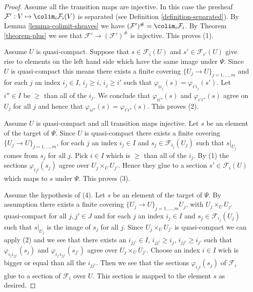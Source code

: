 \begin{proof}
Assume all the transition maps are injective. In this case the presheaf
$\mathcal{F}' : V \mapsto \colim_i \mathcal{F}_i(V)$ is
separated (see Definition \ref{definition-separated}).
By Lemma \ref{lemma-colimit-sheaves}
we have
$(\mathcal{F}')^\# = \colim_i \mathcal{F}_i$.
By Theorem \ref{theorem-plus}
we see that $\mathcal{F}' \to (\mathcal{F}')^\#$ is injective.
This proves (1).

\medskip\noindent
Assume $U$ is quasi-compact.
Suppose that $s \in \mathcal{F}_i(U)$ and
$s' \in \mathcal{F}_{i'}(U)$ give rise to elements on
the left hand side which have the same image under $\Psi$.
Since $U$ is quasi-compact this means there exists
a finite covering $\{U_j \to U\}_{j = 1, \ldots, m}$
and for each $j$ an index $i_j \in I$, $i_j \geq i$, $i_j \geq i'$
such that $\varphi_{ii_j}(s) = \varphi_{i'i_j}(s')$.
Let $i''\in I$ be $\geq$ than all of the $i_j$.
We conclude that $\varphi_{ii''}(s)$ and $\varphi_{i'i''}(s)$
agree on $U_j$ for all $j$ and hence that
$\varphi_{ii''}(s) = \varphi_{i'i''}(s)$. This proves (2).

\medskip\noindent
Assume $U$ is quasi-compact and all transition maps injective.
Let $s$ be an element of the target of $\Psi$.
Since $U$ is quasi-compact
there exists a finite covering $\{U_j \to U\}_{j = 1, \ldots, m}$,
for each $j$ an index $i_j \in I$ and $s_j \in \mathcal{F}_{i_j}(U_j)$
such that $s|_{U_j}$ comes from $s_j$ for all $j$.
Pick $i \in I$ which is $\geq$ than all of the $i_j$.
By (1) the sections $\varphi_{i_ji}(s_j)$ agree over $U_j \times_U U_{j'}$.
Hence they glue to a section
$s' \in \mathcal{F}_i(U)$ which maps to $s$ under $\Psi$.
This proves (3).

\medskip\noindent
Assume the hypothesis of (4).
Let $s$ be an element of the target of $\Psi$.
By assumption there  exists a finite covering
$\{U_j \to U\}_{j = 1, \ldots, m} U_j$, with $U_j \times_U U_{j'}$
quasi-compact for all $j, j' \in J$ and
for each $j$ an index $i_j \in I$ and $s_j \in \mathcal{F}_{i_j}(U_j)$
such that $s|_{U_j}$ is the image of $s_j$ for all $j$.
Since $U_j \times_U U_{j'}$ is quasi-compact we can apply (2)
and we see that there exists an $i_{jj'} \in I$,
$i_{jj'} \geq i_j$, $i_{jj'} \geq i_{j'}$ such that
$\varphi_{i_ji_{jj'}}(s_j)$ and $\varphi_{i_{j'}i_{jj'}}(s_{j'})$
agree over $U_j \times_U U_{j'}$. Choose an index $i \in I$
wich is bigger or equal than all the $i_{jj'}$. Then we see that
the sections $\varphi_{i_ji}(s_j)$ of $\mathcal{F}_i$ glue
to a section of $\mathcal{F}_i$ over $U$. This section is mapped
to the element $s$ as desired.
\end{proof}

